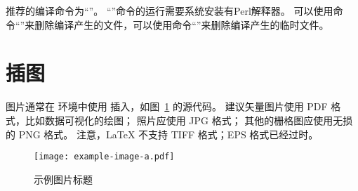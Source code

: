 推荐的编译命令为``''。
``''命令的运行需要系统安装有Perl解释器。
可以使用命令``''来删除编译产生的文件，可以使用命令``''来删除编译产生的临时文件。

\section{插图}

图片通常在  环境中使用  插入，如图~\ref{fig:example} 的源代码。
建议矢量图片使用 PDF 格式，比如数据可视化的绘图；
照片应使用 JPG 格式；
其他的栅格图应使用无损的 PNG 格式。
注意，LaTeX 不支持 TIFF 格式；EPS 格式已经过时。

\begin{figure}
    \centering
    \texttt{[image: example-image-a.pdf]}
    \caption{示例图片标题}
    \label{fig:example}
\end{figure}
  